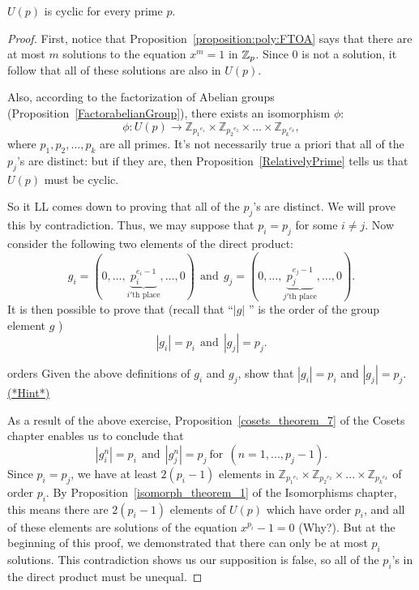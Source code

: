 \begin {prop}{}
$U(p)$ is cyclic for every prime $p$.
\end {prop}
\begin {proof}
First, notice that Proposition~\ref{proposition:poly:FTOA} says that there are at most $m$ solutions to the equation $x^m = 1$ in $\mathbb{Z}_p$. Since 0 is not a solution, it follow that all of these solutions are also in $U(p)$.

Also, according to the factorization of Abelian groups (Proposition~\ref{FactorabelianGroup}), there exists an isomorphism $\phi$:
\[\phi: U(p)  \rightarrow {\mathbb{Z}_{{p_1}^{e_1}}}  \times   {\mathbb{Z}_{{p_2}^{e_2}}}  \times  ... \times   {\mathbb{Z}_{{p_k}^{e_k}}},\]
where $p_1, p_2, \ldots, p_k$ are all primes.  It's not necessarily true a priori  that all of the $p_j$'s are distinct: but if they are, then Proposition~\ref{RelativelyPrime} tells us that $U(p)$ must be cyclic. 

So it LL comes down to proving that all of the $p_j$'s are distinct. We will prove this by contradiction. Thus, we may suppose that $p_i = p_j$ for some $i \neq j$. 
Now consider the following two elements of the direct product:
\[
g_i = ( 0, \ldots ,\underbrace{p_i^{e_i-1}}_{i'\text{th place}},\ldots,0) \mathrm{~~and~~} g_j = ( 0, \ldots ,\underbrace{p_j^{e_j-1}}_{j'\text{th place}},\ldots,0).
\]
It is then possible to prove that (recall that ``$|g|$ '' is the order of the group element $g$ )
\[ |g_i| = p_i \mathrm{~~and~~}  |g_j| = p_j. \]

\begin{exercise}{orders}
Given the above definitions of $g_i$ and $g_j$, show that   $|g_i| = p_i$ and  $|g_j| = p_j$.
\hyperref[sec:polyrings:hints]{(*Hint*)} 
\end{exercise}
As a result of the above exercise, Proposition~\ref{cosets_theorem_7} of the Cosets chapter  enables us to conclude that 
\[
|g_i^n| = p_i \mathrm{~~and~~} |g_j^n| = p_j \mathrm{~ for~~} (n = 1,...,p_j-1).
\]
Since $p_i = p_j$, we have at least $2(p_i-1)$ elements in ${\mathbb{Z}_{{p_1}^{e_1}}}  \times   {\mathbb{Z}_{{p_2}^{e_2}}}  \times  ... \times   {\mathbb{Z}_{{p_k}^{e_k}}}$ of order $p_i$. By 
Proposition~\ref{isomorph_theorem_1} of the Isomorphisms chapter, this means there are  $2(p_i-1)$ elements of $U(p)$ which have order $p_i$, and all of these elements are solutions of the equation $x^{p_i}-1=0$ (Why?). 
But at the beginning of this proof, we demonstrated that there can only be at most $p_i$ solutions. This contradiction shows us our supposition is false, so all of the $p_i$'s in the direct product must be unequal.
\end{proof}
